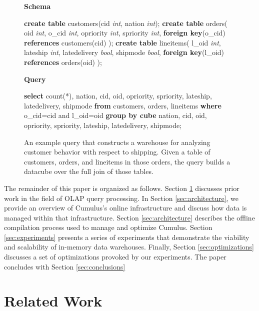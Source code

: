 \begin{figure}
\begin{center}
\textbf{Schema}
\end{center}
\begin{algorithmic}
\STATE \textbf{create table} customers(cid \textit{int}, nation \textit{int}); 
\STATE \textbf{create table} orders(
\STATE \hspace*{0.1in} oid \textit{int}, o\_cid \textit{int}, opriority \textit{int}, spriority \textit{int},
\STATE \hspace*{0.1in}  \textbf{foreign key}(o\_cid) \textbf{references} customers(cid)
\STATE );
\STATE \textbf{create table} lineitems(
\STATE \hspace*{0.1in} l\_oid \textit{int}, lateship \textit{int}, latedelivery \textit{bool}, shipmode \textit{bool},
\STATE \hspace*{0.1in} \textbf{foreign key}(l\_oid) \textbf{references} orders(oid)
\STATE );
\end{algorithmic}
\begin{center}
\textbf{Query}
\end{center}
\begin{algorithmic}
\STATE \textbf{select} count(*),
\STATE \hspace*{0.1in} nation, cid, oid, opriority, spriority, 
\STATE \hspace*{0.1in} lateship, latedelivery, shipmode 
\STATE \textbf{from} customers, orders, lineitems 
\STATE \textbf{where} o\_cid=cid and l\_oid=oid 
\STATE \textbf{group by cube} 
\STATE \hspace*{0.1in} nation, cid, oid, opriority, spriority, 
\STATE \hspace*{0.1in} lateship, latedelivery, shipmode;
\end{algorithmic}
\caption{An example query that constructs a warehouse for analyzing customer behavior with respect to shipping.  Given a table of customers, orders, and lineitems in those orders, the query builds a datacube over the full join of those tables.}
\label{fig:example}  
\end{figure}

The remainder of this paper is organized as follows.  Section \ref{sec:relatedwork} discusses prior work in the field of OLAP query processing.  In Section \ref{sec:architecture}, we provide an overview of Cumulus's online infrastructure and discuss how data is managed within that infrastructure.  Section \ref{sec:architecture} describes the offline compilation process used to manage and optimize Cumulus.  Section \ref{sec:experiments} presents a series of experiments that demonstrate the viability and scalability of in-memory data warehouses.  Finally, Section \ref{sec:optimizations} discusses a set of optimizations provoked by our experiments.  The paper concludes with Section \ref{sec:conclusions}

\section{Related Work}
\label{sec:relatedwork}


